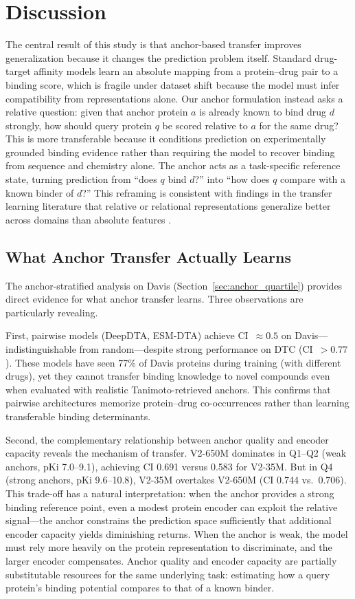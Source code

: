 \section{Discussion}

The central result of this study is that anchor-based transfer improves generalization because it changes the prediction problem itself. Standard drug-target affinity models learn an absolute mapping from a protein--drug pair to a binding score, which is fragile under dataset shift because the model must infer compatibility from representations alone. Our anchor formulation instead asks a relative question: given that anchor protein $a$ is already known to bind drug $d$ strongly, how should query protein $q$ be scored relative to $a$ for the same drug? This is more transferable because it conditions prediction on experimentally grounded binding evidence rather than requiring the model to recover binding from sequence and chemistry alone. The anchor acts as a task-specific reference state, turning prediction from ``does $q$ bind $d$?'' into ``how does $q$ compare with a known binder of $d$?'' This reframing is consistent with findings in the transfer learning literature that relative or relational representations generalize better across domains than absolute features \cite{pan2010transfer,zhuang2021transfer}.

\subsection{What Anchor Transfer Actually Learns}

The anchor-stratified analysis on Davis (Section~\ref{sec:anchor_quartile}) provides direct evidence for what anchor transfer learns. Three observations are particularly revealing.

First, pairwise models (DeepDTA, ESM-DTA) achieve CI~$\approx 0.5$ on Davis---indistinguishable from random---despite strong performance on DTC (CI~$> 0.77$). These models have seen 77\% of Davis proteins during training (with different drugs), yet they cannot transfer binding knowledge to novel compounds even when evaluated with realistic Tanimoto-retrieved anchors. This confirms that pairwise architectures memorize protein--drug co-occurrences rather than learning transferable binding determinants.

Second, the complementary relationship between anchor quality and encoder capacity reveals the mechanism of transfer. V2-650M dominates in Q1--Q2 (weak anchors, pKi 7.0--9.1), achieving CI 0.691 versus 0.583 for V2-35M. But in Q4 (strong anchors, pKi 9.6--10.8), V2-35M overtakes V2-650M (CI 0.744 vs.\ 0.706). This trade-off has a natural interpretation: when the anchor provides a strong binding reference point, even a modest protein encoder can exploit the relative signal---the anchor constrains the prediction space sufficiently that additional encoder capacity yields diminishing returns. When the anchor is weak, the model must rely more heavily on the protein representation to discriminate, and the larger encoder compensates. Anchor quality and encoder capacity are partially substitutable resources for the same underlying task: estimating how a query protein's binding potential compares to that of a known binder.

